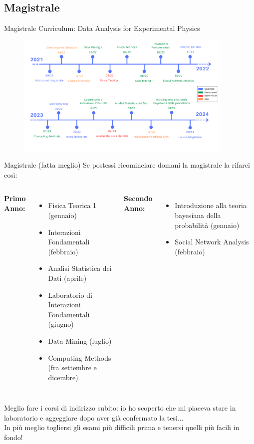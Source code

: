 \documentclass[
10pt,
aspectratio=169,
]{beamer}
\begin{document}
\subsection{Magistrale}

\begin{frame}{Magistrale}
Curriculum: Data Analysis for Experimental Physics

    \begin{figure}
        \centering
        \includegraphics[width=0.93\textwidth]{timeline.pdf}
    \end{figure}
\end{frame}

\begin{frame}[t]{Magistrale (fatta meglio)}
Se postessi ricominciare domani la magistrale la rifarei così:
\vfill
\begin{columns}[T]
    \textbf{Primo Anno:}
    \begin{itemize}
    \item Fisica Teorica 1 (gennaio)
    \item Interazioni Fondamentali (febbraio)
    \item Analisi Statistica dei Dati (aprile)
    \item Laboratorio di Interazioni Fondamentali (giugno)
    \item Data Mining (luglio)
    \item Computing Methods (fra settembre e dicembre)

    \end{itemize}
    \textbf{Secondo Anno:}
    \begin{itemize}
        \item Introduzione alla teoria bayesiana della probabilità (gennaio)
        \item Social Network Analysis (febbraio)
    \end{itemize}
\end{columns}
    \vfill
Meglio fare i corsi di indirizzo subito: io ho scoperto che mi piaceva stare in laboratorio e aggeggiare dopo aver già confermato la tesi... \\
In più meglio togliersi gli esami più difficili prima e tenersi quelli più facili in fondo!
    \end{frame}
\end{document}
